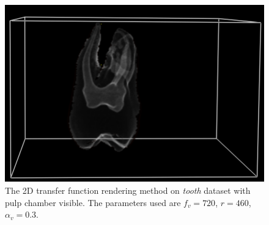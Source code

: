 \documentclass[a4paper]{article}
\begin{document}
\begin{figure}[h]
  \centering
  \includegraphics[width=\textwidth]{tooth-2d}
  \caption{The 2D transfer function rendering method on \textit{tooth} dataset with pulp chamber visible. The parameters used are $f_v = 720$, $r = 460$, $\alpha_v = 0.3$.}
  \label{fig:tooth}
\end{figure}
\end{document}
